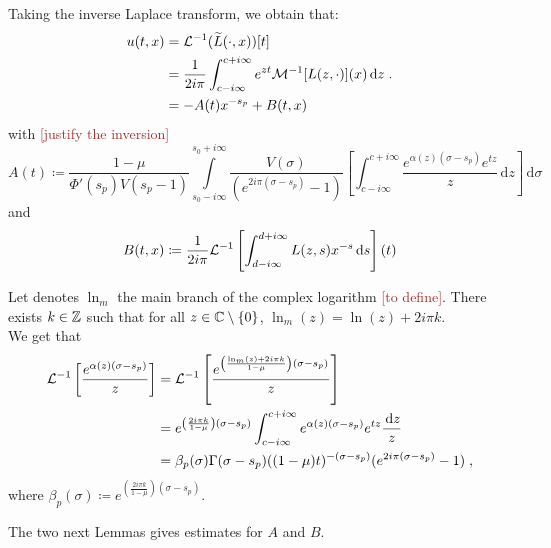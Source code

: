\documentclass[11pt]{amsart}
\newcommand{\diff}{\,\mathrm{d}}
\newcommand{\ndr}[1]{\textcolor{brown}{[#1]}}
\begin{document}
Taking the inverse Laplace transform, we obtain that: 
\begin{align*}
     u(t,x) &= \Lcal^{-1}(\tilde L(\cdot, x))[t] \\
     &= \frac{1}{2i\pi } \int_{c-i\infty}^{c+i\infty} e^{zt}\Mcal^{-1}[L(z,\cdot)](x) \diff z
     \eqfinp\\
     &= -A(t)x^{-s_p} + B(t,x)
\end{align*}
with \ndr{justify the inversion}
\begin{equation}
    A(t) \coloneqq\frac{1-\mu}{\Phi'(s_p) V(s_p-1)}
     \int\limits_{s_0-i\infty}^{s_0+i\infty}
     \frac{V(\sigma)
  }{(e^{2i\pi(\sigma-s_p)}-1)} \left[\int_{c-i\infty}^{c+i\infty} \frac{e^{ \alpha(z)(\sigma-s_p)}e^{tz}}{z}\diff z \right] \diff \sigma
  \label{def:A} 
\end{equation}
and 
\begin{equation}
    B(t,x) \coloneqq \frac{1}{2i\pi} \Lcal^{-1}\left[\int_{d-i\infty}^{d+i\infty} L(z,s)x^{-s}\diff s \right] (t)
\label{def:B}
\end{equation}

Let denotes $\ln_{m}$  the main branch of the complex logarithm \ndr{to define}. There exists $k \in \mathbb{Z}$ such that for all $z \in \mathbb{C} \setminus \{0\}$, $\ln_m(z) = \ln(z) + 2i\pi k. $ \\
We get that 
\begin{subequations}
\begin{align}
    \Lcal^{-1}\left[ \frac{e^{ \alpha(z)(\sigma-s_p)}}{z}  \right]
    &= 
    \Lcal^{-1}\left[ \frac{e^{ \left( \frac{\ln_m(z) + 2i\pi k}{1-\mu} \right) (\sigma-s_p)}}{z}  \right] \\
    &= 
    e^{ \left( \frac{2i\pi k}{1-\mu} \right) (\sigma-s_p)}
    \int_{c-i\infty}^{c+i\infty} e^{ \alpha(z)(\sigma-s_p)}e^{tz}\frac{\diff z}{z}\\
    &= \beta_p(\sigma) \Gamma(\sigma-s_p)((1-\mu)t)^{-(\sigma-s_p)}(e^{2i\pi(\sigma-s_p)}-1)
    \eqfinv
\end{align}
\label{eq:calcLaplInv}
\end{subequations}
where $\beta_p(\sigma) \coloneqq e^{ \left( \frac{2i\pi k}{1-\mu} \right) (\sigma-s_p)}$. 

The two next Lemmas gives estimates for $A$ and $B$. 
\end{document}
